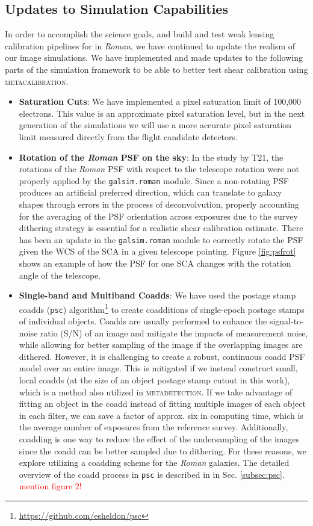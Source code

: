 \documentclass[fleqn,usenatbib]{mnras}
\begin{document}
\subsection{Updates to Simulation Capabilities}
In order to accomplish the science goals, and build and test weak lensing calibration pipelines for in \emph{Roman}, we have continued to update the realism of our image simulations. We have implemented and made updates to the following parts of the simulation framework to be able to better test shear calibration using \textsc{metacalibration}. 
\begin{itemize}
    \setlength\itemsep{1em}
    \item \textbf{Saturation Cuts}:
    We have implemented a pixel saturation limit of 100,000 electrons. This value is an approximate pixel saturation level, but in the next generation of the simulations we will use a more accurate pixel saturation limit measured directly from the flight candidate detectors. 
    
    \item \textbf{Rotation of the \emph{Roman} PSF on the sky}:
    In the study by T21, the rotations of the \emph{Roman} PSF with respect to the telescope rotation were not properly applied by the \texttt{galsim.roman} module. Since a non-rotating PSF produces an artificial preferred direction, which can translate to galaxy shapes through errors in the process of deconvolvution, properly accounting for the averaging of the PSF orientation across exposures due to the survey dithering strategy is essential for a realistic shear calibration estimate. There has been an update in the \texttt{galsim.roman} module to correctly rotate the PSF given the WCS of the SCA in a given telescope pointing. Figure \ref{fig:psfrot} shows an example of how the PSF for one SCA changes with the rotation angle of the telescope.
    
    \item \textbf{Single-band and Multiband Coadds}: 
    We have used the postage stamp coadds (\texttt{psc}) algorithm\footnote{\url{https://github.com/esheldon/psc}} to create coadditions of single-epoch postage stamps of individual objects. Coadds are usually performed to enhance the signal-to-noise ratio (S/N) of an image and mitigate the impacts of measurement noise, while allowing for better sampling of the image if the overlapping images are dithered. However, it is challenging to create a robust, continuous coadd PSF model over an entire image. This is mitigated if we instead construct small, local coadds (at the size of an object postage stamp cutout in this work), which is a method also utilized in \textsc{metadetection}. If we take advantage of fitting an object in the coadd instead of fitting multiple images of each object in each filter, we can save a factor of approx. six in computing time, which is the average number of exposures from the reference survey. Additionally, coadding is one way to reduce the effect of the undersampling of the images since the coadd can be better sampled due to dithering. For these reasons, we explore utilizing a coadding scheme for the \emph{Roman} galaxies. The detailed overview of the coadd process in \texttt{psc} is described in in Sec. \ref{subsec:psc}. \textcolor{red}{mention figure 2!}
    

\end{itemize}
\end{document}
